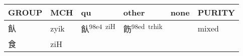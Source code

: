 \documentclass[14pt,a4paper]{scrartcl}
\begin{document}
\begin{longtable}[c]{@{}llllll@{}}
\toprule
\begin{minipage}[b]{0.14\columnwidth}\raggedright\strut
GROUP
\strut\end{minipage} &
\begin{minipage}[b]{0.14\columnwidth}\raggedright\strut
MCH
\strut\end{minipage} &
\begin{minipage}[b]{0.14\columnwidth}\raggedright\strut
qu
\strut\end{minipage} &
\begin{minipage}[b]{0.14\columnwidth}\raggedright\strut
other
\strut\end{minipage} &
\begin{minipage}[b]{0.14\columnwidth}\raggedright\strut
none
\strut\end{minipage} &
\begin{minipage}[b]{0.14\columnwidth}\raggedright\strut
PURITY
\strut\end{minipage}\tabularnewline
\midrule
\endhead
\begin{minipage}[t]{0.14\columnwidth}\raggedright\strut
飤
\strut\end{minipage} &
\begin{minipage}[t]{0.14\columnwidth}\raggedright\strut
zyik
\strut\end{minipage} &
\begin{minipage}[t]{0.14\columnwidth}\raggedright\strut
飤\textsuperscript{98e4~ziH}
\strut\end{minipage} &
\begin{minipage}[t]{0.14\columnwidth}\raggedright\strut
飭\textsuperscript{98ed~trhik}
\strut\end{minipage} &
\begin{minipage}[t]{0.14\columnwidth}\raggedright\strut
\strut\end{minipage} &
\begin{minipage}[t]{0.14\columnwidth}\raggedright\strut
mixed
\strut\end{minipage}\tabularnewline
\begin{minipage}[t]{0.14\columnwidth}\raggedright\strut
食
\strut\end{minipage} &
\begin{minipage}[t]{0.14\columnwidth}\raggedright\strut
ziH
\strut\end{minipage} &
\begin{minipage}[t]{0.14\columnwidth}\raggedright\strut
\strut\end{minipage} &

\end{longtable}
\end{document}
